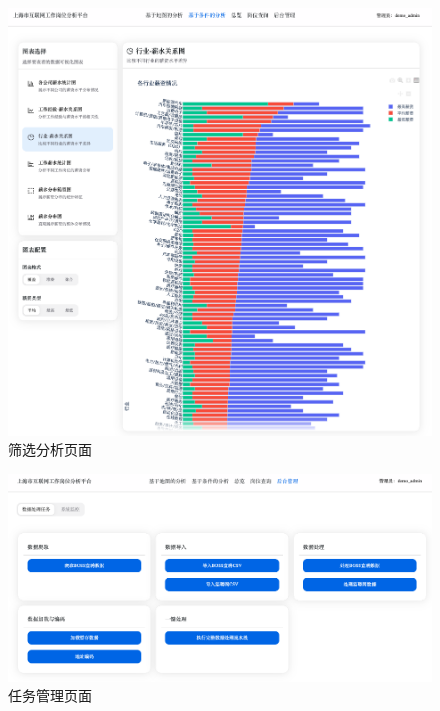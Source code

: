 \begin{figure}[htbp]
    \centering
    \includegraphics[width=1.0\textwidth]{figures/filter_page.png}
    \caption{筛选分析页面}
    \label{fig:filter_page}
\end{figure}

\begin{figure}[htbp]
    \centering
    \includegraphics[width=1.0\textwidth]{figures/task_page1.png}
    \caption{任务管理页面}
    \label{fig:task_page_1}
\end{figure}


